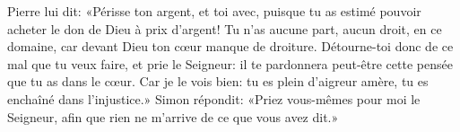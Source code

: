 Pierre lui dit: «Périsse ton argent, et toi avec,
	puisque tu as estimé pouvoir acheter le don de Dieu à prix d’argent!
Tu n’as aucune part, aucun droit, en ce domaine,
	car devant Dieu ton cœur manque de droiture.
Détourne-toi donc de ce mal que tu veux faire, et prie le Seigneur:
	il te pardonnera peut-être cette pensée que tu as dans le cœur.
Car je le vois bien:
	tu es plein d’aigreur amère, tu es enchaîné dans l’injustice.»
Simon répondit: «Priez vous-mêmes pour moi le Seigneur,
	afin que rien ne m’arrive de ce que vous avez dit.»
